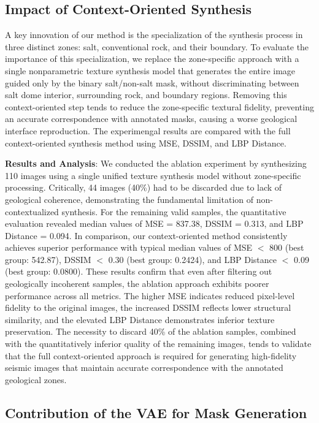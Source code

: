 \documentclass{ieeeaccess}
\DeclareRobustCommand{\DIFaddend}{\DIFOaddend \let\includegraphics\DIFOincludegraphics} %
\providecommand{\DIFaddend}{}
\renewcommand{\DIFaddend}{}
\begin{document}
\DIFaddend \subsection{Impact of Context-Oriented Synthesis}

A key innovation of our method is the specialization of the synthesis process in three distinct zones: salt, conventional rock, and their boundary. To evaluate the importance of this specialization, we replace the zone-specific approach with a single nonparametric texture synthesis model that generates the entire image guided only by the binary salt/non-salt mask, without discriminating between salt dome interior, surrounding rock, and boundary regions. Removing this context-oriented step tends to reduce the zone-specific textural fidelity, preventing an accurate correspondence with annotated masks, causing a worse geological interface reproduction. The experimengal results are compared with the full context-oriented synthesis method using MSE, DSSIM, and LBP Distance.

\textbf{Results and Analysis}: We conducted the ablation experiment by synthesizing 110 images using a single unified texture synthesis model without zone-specific processing. Critically, 44 images (40\%) had to be discarded due to lack of geological coherence, demonstrating the fundamental limitation of non-contextualized synthesis. For the remaining valid samples, the quantitative evaluation revealed median values of MSE = 837.38, DSSIM = 0.313, and LBP Distance = 0.094. In comparison, our context-oriented method consistently achieves superior performance with typical median values of MSE $<$ 800 (best group: 542.87), DSSIM $<$ 0.30 (best group: 0.2424), and LBP Distance $<$ 0.09 (best group: 0.0800). These results confirm that even after filtering out geologically incoherent samples, the ablation approach exhibits poorer performance across all metrics. The higher MSE indicates reduced pixel-level fidelity to the original images, the increased DSSIM reflects lower structural similarity, and the elevated LBP Distance demonstrates inferior texture preservation. The necessity to discard 40\% of the ablation samples, combined with the quantitatively inferior quality of the remaining images, tends to validate that the full context-oriented approach is required for generating high-fidelity seismic images that maintain accurate correspondence with the annotated geological zones.

\subsection{Contribution of the VAE for Mask Generation}
\end{document}
